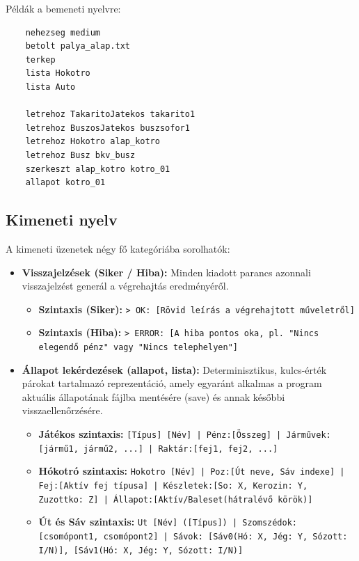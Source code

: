 Példák a bemeneti nyelvre:
\begin{verbatim}
    nehezseg medium
    betolt palya_alap.txt
    terkep
    lista Hokotro
    lista Auto

    letrehoz TakaritoJatekos takarito1
    letrehoz BuszosJatekos buszsofor1
    letrehoz Hokotro alap_kotro
    letrehoz Busz bkv_busz
    szerkeszt alap_kotro kotro_01
    allapot kotro_01
\end{verbatim}

\subsection{Kimeneti nyelv}

A kimeneti üzenetek négy fő kategóriába sorolhatók:

\begin{itemize}
    \item \textbf{Visszajelzések (Siker / Hiba):} Minden kiadott parancs azonnali visszajelzést generál a végrehajtás eredményéről.
    \begin{itemize}
        \item \textbf{Szintaxis (Siker):} \texttt{> OK: [Rövid leírás a végrehajtott műveletről]}
        \item \textbf{Szintaxis (Hiba):} \texttt{> ERROR: [A hiba pontos oka, pl. "Nincs elegendő pénz" vagy "Nincs telephelyen"]}
    \end{itemize}

    \item \textbf{Állapot lekérdezések (allapot, lista):} Determinisztikus, kulcs-érték párokat tartalmazó reprezentáció, amely egyaránt alkalmas a program aktuális állapotának fájlba mentésére (save) és annak későbbi visszaellenőrzésére.
    \begin{itemize}
        \item \textbf{Játékos szintaxis:} \texttt{[Típus] [Név] | Pénz:[Összeg] | Járművek:[jármű1, jármű2, ...] | Raktár:[fej1, fej2, ...]}
        \item \textbf{Hókotró szintaxis:} \texttt{Hokotro [Név] | Poz:[Út neve, Sáv indexe] | Fej:[Aktív fej típusa] | Készletek:[So: X, Kerozin: Y, Zuzottko: Z] | Állapot:[Aktív/Baleset(hátralévő körök)]}
        \item \textbf{Út és Sáv szintaxis:} \texttt{Ut [Név] ([Típus]) | Szomszédok:[csomópont1, csomópont2] | Sávok: [Sáv0(Hó: X, Jég: Y, Sózott: I/N)], [Sáv1(Hó: X, Jég: Y, Sózott: I/N)]}
    \end{itemize}


\end{itemize}
